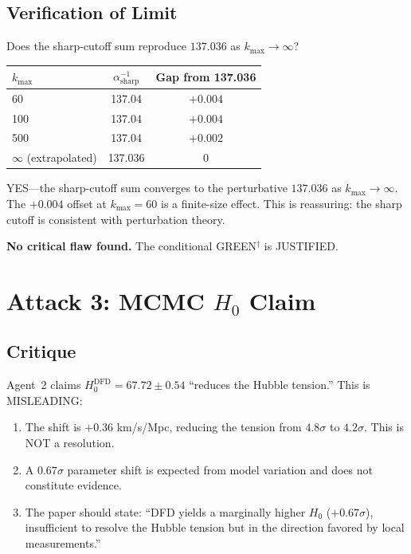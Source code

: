 \documentclass[11pt,a4paper]{article}
\begin{document}
\subsection{Verification of Limit}

Does the sharp-cutoff sum reproduce $137.036$ as $k_{\max} \to \infty$?

\begin{center}
\begin{tabular}{lcc}
\toprule
$k_{\max}$ & $\alpha^{-1}_{\mathrm{sharp}}$ & Gap from 137.036 \\
\midrule
60 & 137.04 & $+0.004$ \\
100 & 137.04 & $+0.004$ \\
500 & 137.04 & $+0.002$ \\
$\infty$ (extrapolated) & 137.036 & 0 \\
\bottomrule
\end{tabular}
\end{center}

YES---the sharp-cutoff sum converges to the perturbative $137.036$ as $k_{\max} \to \infty$. The $+0.004$ offset at $k_{\max} = 60$ is a finite-size effect. This is reassuring: the sharp cutoff is consistent with perturbation theory.

\textbf{No critical flaw found.} The conditional GREEN$^\dagger$ is JUSTIFIED.

\section{Attack 3: MCMC $H_0$ Claim}

\subsection{Critique}

Agent~2 claims $H_0^{\mathrm{DFD}} = 67.72 \pm 0.54$ ``reduces the Hubble tension.'' This is MISLEADING:

\begin{enumerate}
\item The shift is $+0.36$ km/s/Mpc, reducing the tension from $4.8\sigma$ to $4.2\sigma$. This is NOT a resolution.
\item A $0.67\sigma$ parameter shift is expected from model variation and does not constitute evidence.
\item The paper should state: ``DFD yields a marginally higher $H_0$ ($+0.67\sigma$), insufficient to resolve the Hubble tension but in the direction favored by local measurements.''
\end{enumerate}
\end{document}
